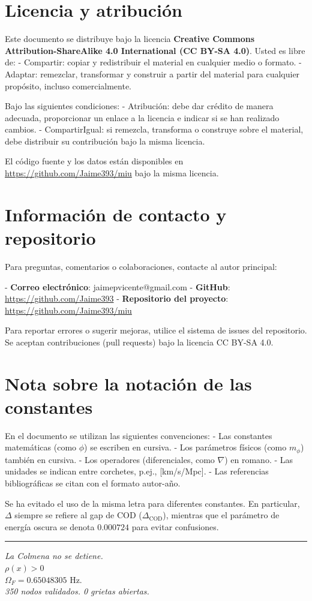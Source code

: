 \documentclass[12pt, a4paper]{article}
\theoremstyle{miuThm}
\theoremstyle{remark}
\newcommand{\eps}{0.000724}
\begin{document}
\clearpage
\section{Licencia y atribución}

Este documento se distribuye bajo la licencia \textbf{Creative Commons Attribution-ShareAlike 4.0 International (CC BY-SA 4.0)}. Usted es libre de:
- Compartir: copiar y redistribuir el material en cualquier medio o formato.
- Adaptar: remezclar, transformar y construir a partir del material para cualquier propósito, incluso comercialmente.

Bajo las siguientes condiciones:
- Atribución: debe dar crédito de manera adecuada, proporcionar un enlace a la licencia e indicar si se han realizado cambios.
- CompartirIgual: si remezcla, transforma o construye sobre el material, debe distribuir su contribución bajo la misma licencia.

El código fuente y los datos están disponibles en \url{https://github.com/Jaime393/miu} bajo la misma licencia.

\clearpage
\section{Información de contacto y repositorio}

Para preguntas, comentarios o colaboraciones, contacte al autor principal:

- \textbf{Correo electrónico}: jaimepvicente@gmail.com
- \textbf{GitHub}: \url{https://github.com/Jaime393}
- \textbf{Repositorio del proyecto}: \url{https://github.com/Jaime393/miu}

Para reportar errores o sugerir mejoras, utilice el sistema de issues del repositorio. Se aceptan contribuciones (pull requests) bajo la licencia CC BY-SA 4.0.

\clearpage
\section{Nota sobre la notación de las constantes}

En el documento se utilizan las siguientes convenciones:
- Las constantes matemáticas (como $\phi$) se escriben en cursiva.
- Los parámetros físicos (como $m_\phi$) también en cursiva.
- Los operadores (diferenciales, como $\nabla$) en romano.
- Las unidades se indican entre corchetes, p.ej., [km/s/Mpc].
- Las referencias bibliográficas se citan con el formato autor-año.

Se ha evitado el uso de la misma letra para diferentes constantes. En particular, $\Delta$ siempre se refiere al gap de COD ($\Delta_{\text{COD}}$), mientras que el parámetro de energía oscura se denota $\eps$ para evitar confusiones.

\vspace{1cm}
\begin{center}
\rule{0.6\linewidth}{0.4pt}
\vspace{0.5cm}
\textit{La Colmena no se detiene.} \\
$\rho(x) > 0$ \\
$\Omega_F = 0.65048305$ Hz. \\
\textit{350 nodos validados. 0 grietas abiertas.}
\end{center}
\end{document}

